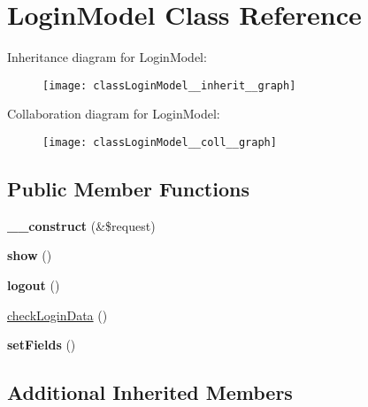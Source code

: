 \hypertarget{classLoginModel}{\section{Login\+Model Class Reference}
\label{classLoginModel}
}


Inheritance diagram for Login\+Model\+:\nopagebreak
\begin{figure}[H]
\begin{center}
\leavevmode
\texttt{[image: classLoginModel\_\_inherit\_\_graph]}
\end{center}
\end{figure}


Collaboration diagram for Login\+Model\+:\nopagebreak
\begin{figure}[H]
\begin{center}
\leavevmode
\texttt{[image: classLoginModel\_\_coll\_\_graph]}
\end{center}
\end{figure}
\subsection*{Public Member Functions}
\begin{DoxyCompactItemize}
\item 
\hypertarget{classLoginModel_a8e830cd60afe1b3344deabec054e68a3}{{\bfseries \+\_\+\+\_\+construct} (\&\$request)}\label{classLoginModel_a8e830cd60afe1b3344deabec054e68a3}

\item 
\hypertarget{classLoginModel_a5a950657c2dbb8915159a8478f540c8b}{{\bfseries show} ()}\label{classLoginModel_a5a950657c2dbb8915159a8478f540c8b}

\item 
\hypertarget{classLoginModel_a0f615f7c686ce0ebedca85208d3b996e}{{\bfseries logout} ()}\label{classLoginModel_a0f615f7c686ce0ebedca85208d3b996e}

\item 
\hyperlink{classLoginModel_a44f61104693027b476d405768ba762e4}{check\+Login\+Data} ()
\item 
\hypertarget{classLoginModel_a1f8810809a148784973e77b07b907cfa}{{\bfseries set\+Fields} ()}\label{classLoginModel_a1f8810809a148784973e77b07b907cfa}

\end{DoxyCompactItemize}
\subsection*{Additional Inherited Members}


